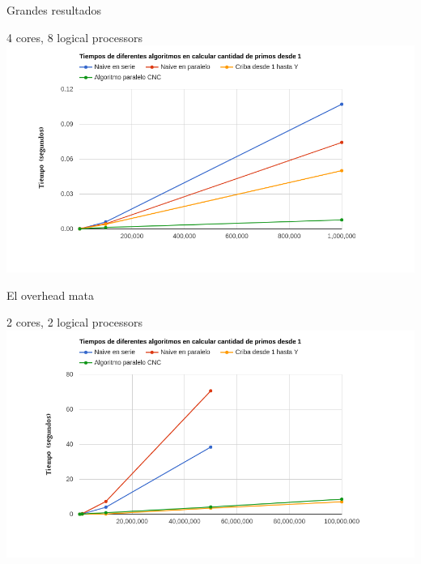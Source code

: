 \documentclass[compress]{beamer}
\begin{document}
\begin{frame}{Grandes resultados}
  \begin{center}
  {4 cores, 8 logical processors}
  \\
  \includegraphics[width=1.15\textwidth]{imagenes/principioJulian.png}%
  \end{center}
\end{frame}

\begin{frame}{El overhead mata}
  \begin{center}
  {2 cores, 2 logical processors}
  \\
  \includegraphics[width=1.15\textwidth]{imagenes/todoLucas.png}%
  \end{center}
\end{frame}
\end{document}
